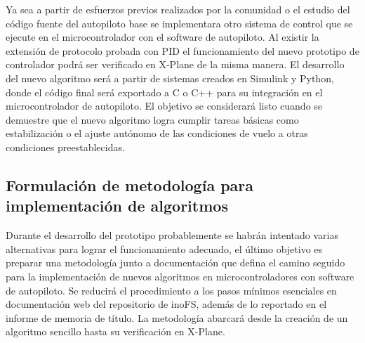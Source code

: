 Ya sea a partir de esfuerzos previos realizados por la comunidad o el estudio del código fuente del autopiloto base se implementara otro sistema de control que se ejecute en el microcontrolador con el software de autopiloto. Al existir la extensión de protocolo probada con PID el funcionamiento del nuevo prototipo de controlador podrá ser verificado en X-Plane de la misma manera. El desarrollo del nuevo algoritmo será a partir de sistemas creados en Simulink y Python, donde el código final será exportado a C o C++ para su integración en el microcontrolador de autopiloto. El objetivo se considerará listo cuando se demuestre que el nuevo algoritmo logra cumplir tareas básicas como estabilización o el ajuste autónomo de las condiciones de vuelo a otras condiciones preestablecidas.

\subsection{Formulación de metodología para implementación de algoritmos}

Durante el desarrollo del prototipo probablemente se habrán intentado varias alternativas para lograr el funcionamiento adecuado, el último objetivo es preparar una metodología junto a documentación que defina el camino seguido para la implementación de nuevos algoritmos en microcontroladores con software de autopiloto. Se reducirá el procedimiento a los pasos mínimos esenciales en documentación web del repositorio de inoFS, además de lo reportado en el informe de memoria de título. La metodología abarcará desde la creación de un algoritmo sencillo hasta su verificación en X-Plane.